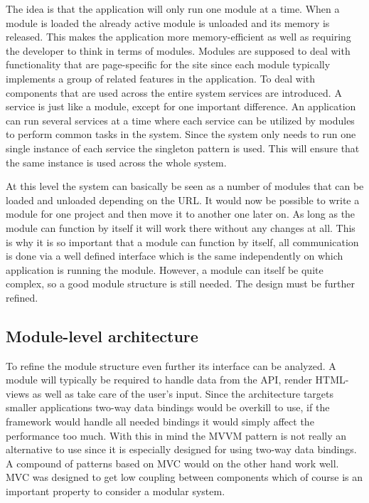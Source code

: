 The idea is that the application will only run one module at a time. When a module is loaded the already active module is unloaded and its memory is released. This makes the application more memory-efficient as well as requiring the developer to think in terms of modules. Modules are supposed to deal with functionality that are page-specific for the site since each module typically implements a group of related features in the application. To deal with components that are used across the entire system services are introduced. A service is just like a module, except for one important difference. An application can run several services at a time where each service can be utilized by modules to perform common tasks in the system. Since the system only needs to run one single instance of each service the singleton pattern is used. This will ensure that the same instance is used across the whole system.

At this level the system can basically be seen as a number of modules that can be loaded and unloaded depending on the URL. It would now be possible to write a module for one project and then move it to another one later on. As long as the module can function by itself it will work there without any changes at all. This is why it is so important that a module can function by itself, all communication is done via a well defined interface which is the same independently on which application is running the module. However, a module can itself be quite complex, so a good module structure is still needed. The design must be further refined.

\subsection{Module-level architecture}

To refine the module structure even further its interface can be analyzed. A module will typically be required to handle data from the API, render HTML-views as well as take care of the user's input. Since the architecture targets smaller applications two-way data bindings would be overkill to use, if the framework would handle all needed bindings it would simply affect the performance too much. With this in mind the MVVM pattern is not really an alternative to use since it is especially designed for using two-way data bindings. A compound of patterns based on MVC would on the other hand work well. MVC was designed to get low coupling between components which of course is an important property to consider a modular system.

